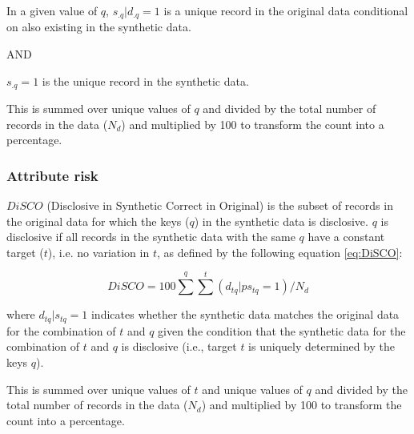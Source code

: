 \documentclass[t,8pt,utfx8]{beamer}
\begin{document}
\begin{spacing}{1.25}
\begin{frame}[t]
In a given value of $q$, $s_{.q}|d_{.q} = 1$ is a unique record in the original data conditional on also existing in the synthetic data.  

AND

$s_{.q} = 1$ is the unique record in the synthetic data.  

This is summed over unique values of $q$ and divided by the total number of records in the data ($N_{d}$) and multiplied by 100 to transform the count into a percentage.


\end{frame}

\begin{frame}[t]\frametitle{Attribute risk}

$DiSCO$ (Disclosive in Synthetic Correct in Original) is the subset of records in the original data for which the keys ($q$) in the synthetic data is disclosive. $q$ is disclosive if all records in the synthetic data with the same $q$ have a constant target ($t$), i.e. no variation in $t$, as defined by the following equation \ref{eq:DiSCO}:

\begin{equation}
DiSCO = 100 \sum^{q} \sum^{t} (d_{tq} | ps_{tq} = 1) / N_{d}
\label{eq:DiSCO}
\end{equation}

where $d_{tq} | s_{tq} = 1$ indicates whether the synthetic data matches the original data for the combination of $t$ and $q$ given the condition that the synthetic data for the combination of $t$ and $q$ is disclosive (i.e., target $t$ is uniquely determined by the keys $q$).  

This is summed over unique values of $t$ and unique values of $q$ and divided by the total number of records in the data ($N_{d}$) and multiplied by 100 to transform the count into a percentage.
\end{frame}


\end{spacing}
\end{document}
